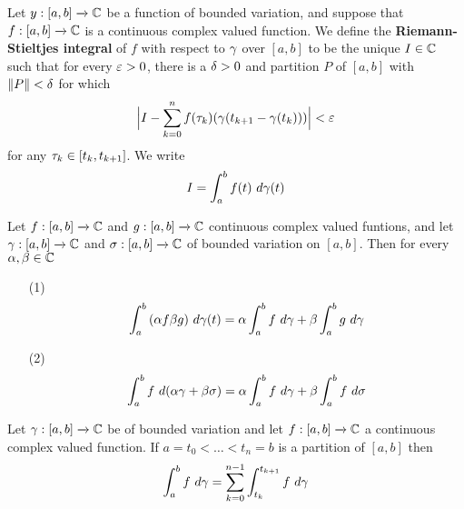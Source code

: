 \begin{definition}
    Let $y:[a,b] \xrightarrow{} \mathbb{C}$ be a function of bounded variation, and
    suppose that $f:[a,b] \xrightarrow{} \mathbb{C}$ is a continuous complex valued
    function. We define the \textbf{Riemann-Stieltjes integral} of $f$ with
    respect to  $\gamma$ over $[a,b]$ to be the unique $I \in \mathbb{C}$ such that for
    every  $\varepsilon>0$, there is a $\delta>0$ and partition $P$ of $[a,b]$ with
    $\|P\|<\delta$ for which
    \begin{equation*}
        \Big{|} I-\sum_{k=0}^n{f(\tau_k)(\gamma(t_{k+1}-\gamma(t_k)))} \Big{|}<\varepsilon
    \end{equation*}
    for any $\tau_k \in [t_k,t_{k+1}]$. We write
    \begin{equation*}
        I=\int_a^b{f(t) \ d\gamma(t)}
    \end{equation*}
\end{definition}

\begin{theorem}\label{4.1.7}
    Let $f:[a,b] \xrightarrow{} \mathbb{C}$ and $g:[a,b] \xrightarrow{} \mathbb{C}$ continuous
    complex valued funtions, and let $\gamma:[a,b] \xrightarrow{} \mathbb{C}$ and $\sigma:[a,b]
    \xrightarrow{} \mathbb{C}$ of bounded variation on $[a,b]$. Then for every $\alpha,\beta
    \in \mathbb{C}$
    \begin{enumerate}
        \item[(1)] $$\int_a^b{(\alpha{f}\beta{g}) \ d\gamma(t)}=\alpha\int_a^b{f \
            d\gamma}+\beta\int_a^b{g \ d\gamma}$$

        \item[(2)] $$\int_a^b{f \ d{(\alpha\gamma+\beta\sigma)}}=\alpha\int_a^b{f \
            d\gamma}+\beta\int_a^b{f \ d\sigma}$$
    \end{enumerate}
\end{theorem}

\begin{theorem}\label{4.1.8}
    Let $\gamma:[a,b] \xrightarrow{} \mathbb{C}$ be of bounded variation and let $f:[a,b]
    \xrightarrow{} \mathbb{C}$ a continuous complex valued function. If
    $a=t_0<\dots<t_n=b$ is a partition of $[a,b]$ then
    \begin{equation*}
    \int_a^b{f \ d\y}=\sum_{k=0}^{n-1}{\int_{t_k}^{t_{k+1}}{f \ d\y}}
    \end{equation*}
\end{theorem}

